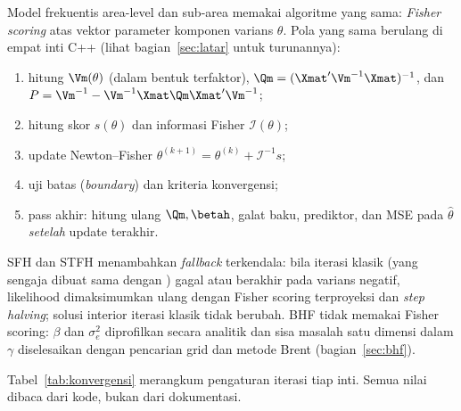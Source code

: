 Model frekuentis area-level dan sub-area memakai algoritme yang sama:
\emph{Fisher scoring} atas vektor parameter komponen varians $\theta$. Pola
yang sama berulang di empat inti C++ (lihat bagian~\ref{sec:latar} untuk
turunannya):

\begin{enumerate}[label=\arabic*.]
  \item hitung $\Vm(\theta)$ (dalam bentuk terfaktor), $\Qm=(\Xmat'\Vm^{-1}\Xmat)^{-1}$,
        dan $P=\Vm^{-1}-\Vm^{-1}\Xmat\Qm\Xmat'\Vm^{-1}$;
  \item hitung skor $s(\theta)$ dan informasi Fisher $\mathcal I(\theta)$;
  \item update Newton--Fisher $\theta^{(k+1)}=\theta^{(k)}+\mathcal
        I^{-1}s$;
  \item uji batas (\emph{boundary}) dan kriteria konvergensi;
  \item pass akhir: hitung ulang $\Qm,\betah$, galat baku, prediktor, dan MSE
        pada $\hat\theta$ \emph{setelah} update terakhir.
\end{enumerate}
SFH dan STFH menambahkan \emph{fallback} terkendala: bila iterasi klasik (yang
sengaja dibuat sama dengan ) gagal atau berakhir pada varians negatif,
likelihood dimaksimumkan ulang dengan Fisher scoring terproyeksi dan
\emph{step halving}; solusi interior iterasi klasik tidak berubah. BHF tidak
memakai Fisher scoring: $\beta$ dan $\sigma_e^2$ diprofilkan secara analitik
dan sisa masalah satu dimensi dalam $\gamma$ diselesaikan dengan pencarian grid
dan metode Brent (bagian~\ref{sec:bhf}).

Tabel~\ref{tab:konvergensi} merangkum pengaturan iterasi tiap inti. Semua nilai
dibaca dari kode, bukan dari dokumentasi.

